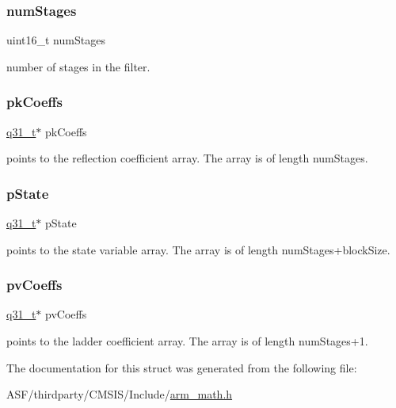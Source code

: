 \subsubsection{\texorpdfstring{numStages}{numStages}}
{\footnotesize\ttfamily uint16\+\_\+t num\+Stages}

number of stages in the filter. \mbox{\label{structarm__iir__lattice__instance__q31_a9d45339bf841bf86aec57be5f70d2b01}} 
\subsubsection{\texorpdfstring{pkCoeffs}{pkCoeffs}}
{\footnotesize\ttfamily \mbox{\hyperlink{arm__math_8h_adc89a3547f5324b7b3b95adec3806bc0}{q31\+\_\+t}}$\ast$ pk\+Coeffs}

points to the reflection coefficient array. The array is of length num\+Stages. \mbox{\label{structarm__iir__lattice__instance__q31_adee4ba3ee8869865af7d8fa08ca913d6}} 
\subsubsection{\texorpdfstring{pState}{pState}}
{\footnotesize\ttfamily \mbox{\hyperlink{arm__math_8h_adc89a3547f5324b7b3b95adec3806bc0}{q31\+\_\+t}}$\ast$ p\+State}

points to the state variable array. The array is of length num\+Stages+block\+Size. \mbox{\label{structarm__iir__lattice__instance__q31_a3d7de56fe9de3458f033a64f14407533}} 
\subsubsection{\texorpdfstring{pvCoeffs}{pvCoeffs}}
{\footnotesize\ttfamily \mbox{\hyperlink{arm__math_8h_adc89a3547f5324b7b3b95adec3806bc0}{q31\+\_\+t}}$\ast$ pv\+Coeffs}

points to the ladder coefficient array. The array is of length num\+Stages+1. 

The documentation for this struct was generated from the following file\+:\begin{DoxyCompactItemize}
\item 
A\+S\+F/thirdparty/\+C\+M\+S\+I\+S/\+Include/\mbox{\hyperlink{arm__math_8h}{arm\+\_\+math.\+h}}\end{DoxyCompactItemize}
